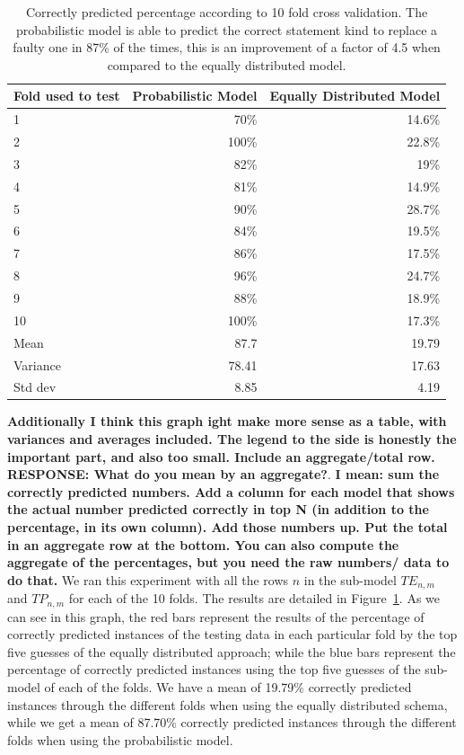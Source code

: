 \documentclass[conference]{IEEEtran}
\newcommand{\todo}[1]
  {{\scriptsize \textbf{\color{red} {#1}}}}
\begin{document}
\begin{table}[ht]
\begin{tabular}{lrr}
Fold used to test	&Probabilistic Model&	Equally Distributed Model\\
	\hline
1	&70\%&	14.6\%\\
2	&100\%&	22.8\%\\
3	&82\%	&19\%\\
4	&81\%	&14.9\%\\
5	&90\%	&28.7\%\\
6	&84\%	&19.5\%\\
7	&86\%	&17.5\%\\
8	&96\%	&24.7\%\\
9	&88\%	&18.9\%\\
10	&100\%	&17.3\%\\
	\hline
Mean	&87.7	&19.79\\
	\hline
Variance	&78.41&	17.63\\
	\hline
Std dev	&8.85&	4.19\\
\hline
\end{tabular}
\center
  \caption{Correctly predicted percentage according to 10 fold cross
    validation. The probabilistic model is able to predict the correct statement kind to replace a faulty one in 87\% of the times, this is an improvement of a factor of 4.5 when compared to the equally distributed model.}
  \label{fig:results10fcv}
\end{table} 


\todo{Additionally I think this graph ight make more
      sense as a table, with variances and averages included.  The legend to the
      side is honestly the important part, and also too small.  Include an
      aggregate/total row. RESPONSE: What do you mean by an aggregate?}. 
\todo{I mean: sum the correctly predicted numbers.  Add a column for each model
  that shows the actual number predicted correctly in top N (in addition to the
  percentage, in its own column).  Add those numbers up.  Put the total in an
  aggregate row at the bottom.  You can also compute the aggregate of the
  percentages, but you need the raw numbers/ data to do that.}
We ran this experiment with all the rows $n$ in the sub-model $TE_{n,m}$ and 
$TP_{n,m}$ for each of the 10 
folds. The results are detailed in Figure~\ref{fig:results10fcv}. As we can see 
in this graph, the red bars represent the results of the percentage of correctly 
predicted instances of the testing data in each particular fold by the top five guesses of the equally distributed approach; while the blue 
bars represent the percentage of correctly predicted instances using the top five 
guesses of the sub-model of each of the folds. We have a mean of 19.79\% 
correctly predicted instances through the different folds when using the equally 
distributed schema, while we get a mean of 87.70\% correctly predicted instances 
through the different folds when using the probabilistic model. 
\end{document}
